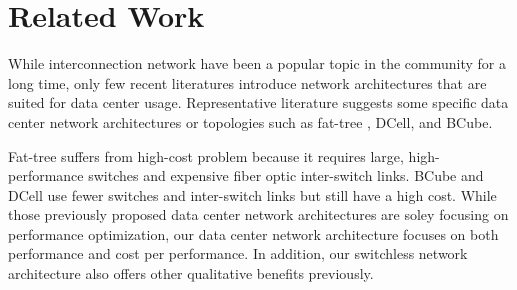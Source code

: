 \section{Related Work}
\label{sec:related}

While interconnection network have been a popular topic in the community for a long time\cite{datacenter3}, only few recent literatures introduce network architectures that are suited for data center usage. Representative literature suggests some specific data center network architectures or topologies such as fat-tree \cite{Al-Fares:2008:SCD, datacenter4}, DCell\cite{datacenter2}, and BCube\cite{datacenter5}. 

Fat-tree suffers from high-cost problem because it requires large, high-performance switches and expensive fiber optic inter-switch links. BCube and DCell use fewer switches and inter-switch links but still have a high cost. While those previously proposed data center network architectures are soley focusing on performance optimization, our data center network architecture focuses on both performance and cost per performance. In addition, our switchless network architecture also offers other qualitative benefits previously.
